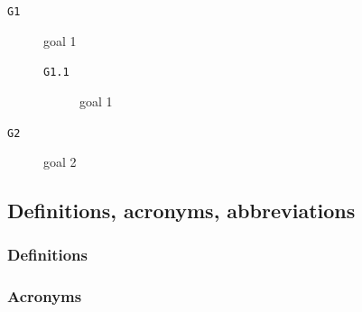 \documentclass[12pt]{article}
\begin{document}

        \begin{description}
          \item [\texttt{G1}] goal 1
          \begin{description}
            \item [\texttt{G1.1}] goal 1
          \end{description}
          \item [\texttt{G2}] goal 2
        \end{description}

  \subsection{Definitions, acronyms, abbreviations}

    \subsubsection{Definitions}

      \begin{description}
        \item[]
      \end{description}

    \subsubsection{Acronyms}
\end{document}

